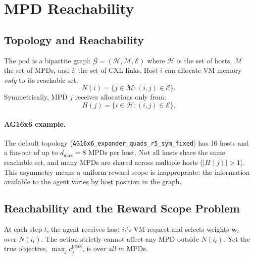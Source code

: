 \documentclass[11pt]{article}
\begin{document}
\section{MPD Reachability}
\label{sec:reachability}

\subsection{Topology and Reachability}

The pod is a bipartite graph $\mathcal{G} = (\mathcal{H}, \mathcal{M},
\mathcal{E})$ where $\mathcal{H}$ is the set of hosts, $\mathcal{M}$ the
set of MPDs, and $\mathcal{E}$ the set of CXL links.  Host $i$ can
allocate VM memory \emph{only} to its reachable set:
\begin{equation}
  N(i) = \{ j \in \mathcal{M} : (i, j) \in \mathcal{E} \}.
\end{equation}
Symmetrically, MPD $j$ receives allocations only from:
\begin{equation}
  H(j) = \{ i \in \mathcal{H} : (i, j) \in \mathcal{E} \}.
\end{equation}

\paragraph{AG16x6 example.}
The default topology (\texttt{AG16x6\_expander\_quads\_r5\_sym\_fixed})
has 16 hosts and a fan-out of up to $d_{\max} = 8$ MPDs per host.
Not all hosts share the same reachable set, and many MPDs are shared across
multiple hosts ($|H(j)| > 1$).  This asymmetry means a uniform reward
scope is inappropriate: the information available to the agent varies by
host position in the graph.

\subsection{Reachability and the Reward Scope Problem}

At each step $t$, the agent receives host $i_t$'s VM request and selects
weights $\mathbf{w}_t$ over $N(i_t)$.  The action strictly cannot affect
any MPD outside $N(i_t)$.  Yet the true objective,
$\max_j c_j^{\text{peak}}$, is over \emph{all} $m$ MPDs.
\end{document}
